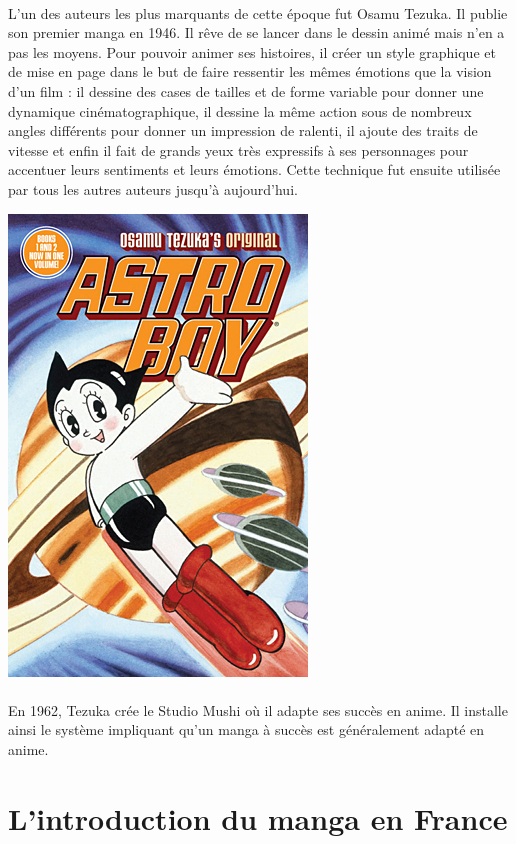 \paragraph{}
L’un des auteurs les plus marquants de cette époque fut Osamu Tezuka. Il publie son premier manga en 1946. Il rêve de se lancer dans le dessin animé mais n’en a pas les moyens. Pour pouvoir animer ses histoires, il créer un style graphique et de mise en page dans le but de faire ressentir les mêmes émotions que la vision d’un film : il dessine des cases de tailles et de forme variable pour donner une dynamique cinématographique, il dessine la même action sous de nombreux angles différents pour donner un impression de ralenti, il ajoute des traits de vitesse et enfin il fait de grands yeux très expressifs à ses personnages pour accentuer leurs sentiments et leurs émotions. Cette technique fut ensuite utilisée par tous les autres auteurs jusqu’à aujourd’hui. 
\begin{center}
\includegraphics[scale=0.4]{astroboy.jpg}
\end{center}
\paragraph{}
En 1962, Tezuka crée le Studio Mushi où il adapte ses succès en anime. Il installe ainsi le système impliquant qu’un manga à succès est généralement adapté en anime.

\section{L'introduction du manga en France}
